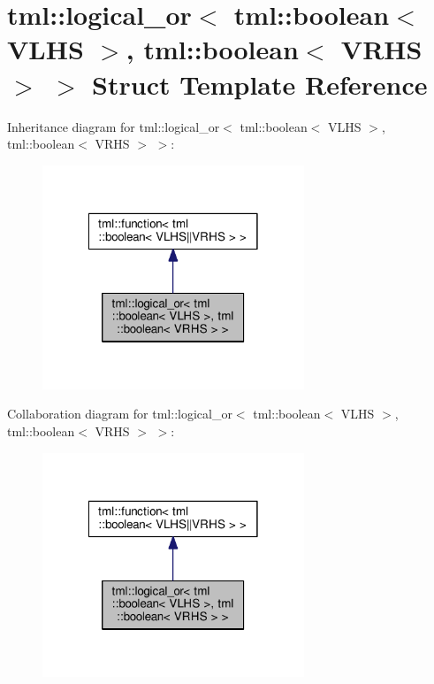 \hypertarget{structtml_1_1logical__or_3_01tml_1_1boolean_3_01_v_l_h_s_01_4_00_01tml_1_1boolean_3_01_v_r_h_s_01_4_01_4}{\section{tml\+:\+:logical\+\_\+or$<$ tml\+:\+:boolean$<$ V\+L\+H\+S $>$, tml\+:\+:boolean$<$ V\+R\+H\+S $>$ $>$ Struct Template Reference}
\label{structtml_1_1logical__or_3_01tml_1_1boolean_3_01_v_l_h_s_01_4_00_01tml_1_1boolean_3_01_v_r_h_s_01_4_01_4}
}


Inheritance diagram for tml\+:\+:logical\+\_\+or$<$ tml\+:\+:boolean$<$ V\+L\+H\+S $>$, tml\+:\+:boolean$<$ V\+R\+H\+S $>$ $>$\+:
\nopagebreak
\begin{figure}[H]
\begin{center}
\leavevmode
\includegraphics[width=222pt]{structtml_1_1logical__or_3_01tml_1_1boolean_3_01_v_l_h_s_01_4_00_01tml_1_1boolean_3_01_v_r_h_s_01_4_01_4__inherit__graph}
\end{center}
\end{figure}


Collaboration diagram for tml\+:\+:logical\+\_\+or$<$ tml\+:\+:boolean$<$ V\+L\+H\+S $>$, tml\+:\+:boolean$<$ V\+R\+H\+S $>$ $>$\+:
\nopagebreak
\begin{figure}[H]
\begin{center}
\leavevmode
\includegraphics[width=222pt]{structtml_1_1logical__or_3_01tml_1_1boolean_3_01_v_l_h_s_01_4_00_01tml_1_1boolean_3_01_v_r_h_s_01_4_01_4__coll__graph}
\end{center}
\end{figure}
